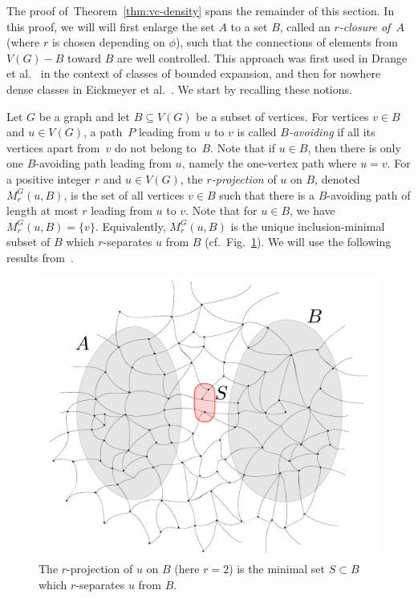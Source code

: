  \medskip The proof of~Theorem~\ref{thm:vc-density} spans the
 remainder of this section.  In this proof, we will will first enlarge
 the set $A$ to a set $B$, called an \emph{$r$-closure of~$A$} (where
 $r$ is chosen depending on $\phi$), such that the connections of
 elements from $V(G)-B$ toward $B$ are well controlled. This approach
 was first used in Drange et al.~\cite{drange2016kernelization} in the
 context of classes of bounded expansion, and then for nowhere dense
 classes in Eickmeyer et al.~\cite{eickmeyer2016neighborhood}.  We
 start by recalling these notions.

Let $G$ be a graph and let $B\subseteq V(G)$ be a subset of
vertices. For vertices $v\in B$ and $u\in V(G)$, a path~$P$ leading
from $u$ to $v$ is called {\em{$B$-avoiding}} if all its vertices
apart from~$v$ do not belong to~$B$. Note that if $u\in B$, then there
is only one $B$-avoiding path leading from $u$, namely the one-vertex
path where $u=v$.  For a positive integer $r$ and $u\in V(G)$, the
{\em{$r$-projection}} of $u$ on $B$, denoted $M^G_r(u,B)$, is the set
of all vertices $v\in B$ such that there is a $B$-avoiding path of
length at most $r$ leading from $u$ to $v$. Note that for $u\in B$, we
have $M^G_r(u,B)=\{v\}$.  Equivalently, $M^G_r(u,B)$ is the unique
inclusion-minimal subset of $B$ which $r$-separates $u$ from $B$
(cf.~Fig.~\ref{fig:projection}). We will use the following results
from~\cite{drange2016kernelization,eickmeyer2016neighborhood}.

\vspace{-2pt}
\begin{figure}[h!]
  \centering
  \includegraphics[scale=0.35,page=2]{pics}
  \caption{The $r$-projection of $u$ on $B$ (here $r=2$) is the
    minimal set $S\subset B$ which $r$-separates $ u$ from $B$.  }
  \label{fig:projection}
\end{figure}



